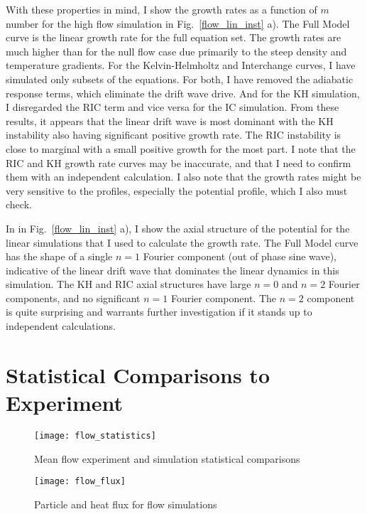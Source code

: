 With these properties in mind, I show the growth rates as a function of $m$ number for the high flow simulation in Fig.~\ref{flow_lin_inst} a). The Full Model curve is the linear growth rate
for the full equation set. The growth rates are much higher than for the null flow case due primarily to the steep density and temperature gradients. For the Kelvin-Helmholtz and Interchange
curves, I have simulated only subsets of the equations. For both, I have removed the adiabatic response terms, which eliminate the drift wave drive. And for the KH simulation, I disregarded
the RIC term and vice versa for the IC simulation. From these results, it appears that the linear drift wave is most dominant with the KH instability also having significant positive growth
rate. The RIC instability
is close to marginal with a small positive growth for the most part. I note that the RIC and KH growth rate curves may be inaccurate, and that I need to confirm them with an independent calculation.
I also note that the growth rates might be very sensitive to the profiles, especially the potential profile, which I also must check.

In in Fig.~\ref{flow_lin_inst} a), I show the axial structure of the potential for the linear simulations that I used to calculate the growth rate. The Full Model curve has the shape of 
a single $n=1$ Fourier component (out of phase sine wave), indicative of the linear drift wave that dominates the linear dynamics in this simulation. The KH and RIC axial structures
have large $n=0$ and $n=2$ Fourier components, and no significant $n=1$ Fourier component. The $n=2$ component is quite surprising and warrants further investigation if it stands up to
independent calculations.

\section{Statistical Comparisons to Experiment}
\label{s_flow_stats}

\begin{figure}[!ht]
\centerline{\texttt{[image: flow\_statistics]}}
\caption{Mean flow experiment and simulation statistical comparisons}
\label{flow_statistics}
\end{figure}

\begin{figure}[!ht]
\centerline{\texttt{[image: flow\_flux]}}
\caption{Particle and heat flux for flow simulations}
\label{flow_flux}
\end{figure}

